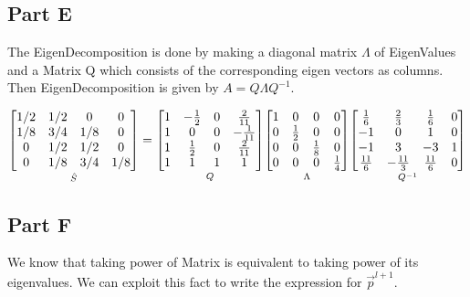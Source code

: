 \documentclass[12pt,a4paper]{article}
\begin{document}
\subsection{Part E}
The EigenDecomposition is done by making a diagonal matrix $\Lambda$ of EigenValues and a Matrix Q which consists of the corresponding eigen vectors as columns. Then EigenDecomposition is given by $A = Q \Lambda Q^{-1}$.

$$
\underset{\Hat{S}}{
\begin{bmatrix}
    1/2 & 1/2 & 0   & 0  \\    
    1/8 & 3/4 & 1/8 & 0   \\    
     0  & 1/2 & 1/2 & 0   \\     
     0  & 1/8 & 3/4 & 1/8
\end{bmatrix}}
 = \underset{Q}{
\begin{bmatrix}
1 & -\frac{1}{2} & 0 & \frac{2}{11}\\
1 & 0 & 0 & -\frac{1}{11}\\
1 & \frac{1}{2} & 0 & \frac{2}{11}\\
1 & 1 & 1 & 1
\end{bmatrix}}\underset{\Lambda}{
\begin{bmatrix}
1 & 0 & 0 & 0\\
0 & \frac{1}{2} & 0 & 0\\
0 & 0 & \frac{1}{8} & 0\\
0 & 0 & 0 & \frac{1}{4}
\end{bmatrix}}\underset{Q^{-1}}{
\begin{bmatrix}\frac{1}{6}&\frac{2}{3}&\frac{1}{6}&0\\ -1&0&1&0\\ -1&3&-3&1\\ \frac{11}{6}&-\frac{11}{3}&\frac{11}{6}&0\end{bmatrix}}
$$

\subsection{Part F}

We know that taking power of Matrix is equivalent to taking power of its eigenvalues. We can exploit this fact to write the expression for $\Vec{p}^{l+1}$.
\end{document}
